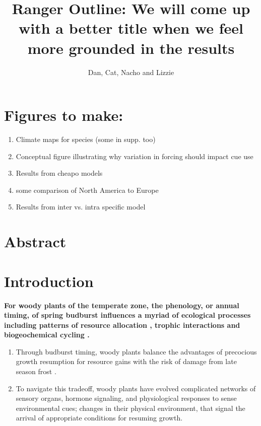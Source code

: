 \documentclass[11pt]{article}\usepackage[]{graphicx}\usepackage[]{color}
\title{Ranger Outline: We will come up with a better title when we feel more grounded in the results}
\date{}
\author{Dan, Cat, Nacho and Lizzie}
\begin{document}
\maketitle
\section*{Figures to make:}
\begin{enumerate}
\item Climate maps for species (some in supp. too)
\item Conceptual figure illustrating why variation in forcing should impact cue use
\item Results from cheapo models
\item some comparison of North America to Europe
\item Results from inter vs. intra specific model

\end{enumerate}
\section*{Abstract}
\section*{Introduction}
\textbf{For woody plants of the temperate zone, the phenology, or annual timing, of spring budburst influences a myriad of ecological processes including patterns of resource allocation \citep{}, trophic interactions \citep{} and biogeochemical cycling \citep{}.}
\begin{enumerate}
\item Through budburst timing, woody plants balance the advantages of precocious growth resumption for resource gains with the risk of damage from late season frost \citep{}.
\item To navigate this tradeoff, woody plants have evolved complicated networks of sensory organs, hormone signaling, and physiological responses to sense environmental cues; changes in their physical environment, that signal the arrival of appropriate conditions for resuming growth.
\end{enumerate}
\end{document}
